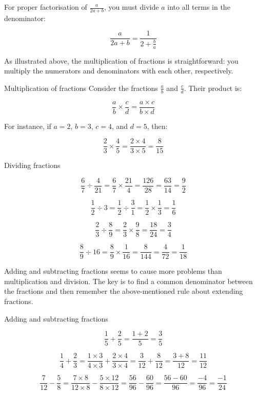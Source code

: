 For proper factorisation of \(\frac{a}{2a + b}\), you must divide \(a\) into all terms in the denominator:

\[
\frac{a}{2a + b} = \frac{1}{2 + \frac{b}{a}}
\]

As illustrated above, the multiplication of fractions is straightforward: you multiply the numerators and denominators with each other, respectively.

\begin{example} Multiplication of fractions \newline
Consider the fractions \(\frac{a}{b}\) and \(\frac{c}{d}\). Their product is:

\[
\frac{a}{b} \times \frac{c}{d} = \frac{a \times c}{b \times d}
\]

For instance, if \(a = 2\), \(b = 3\), \(c = 4\), and \(d = 5\), then:

\[
\frac{2}{3} \times \frac{4}{5} = \frac{2 \times 4}{3 \times 5} = \frac{8}{15}
\]
  
\end{example} 

\begin{example} Dividing fractions

\[
\frac{6}{7} \div \frac{4}{21} = \frac{6}{7} \times \frac{21}{4} = \frac{126}{28} = \frac{63}{14} = \frac{9}{2}
\]

\[
\frac{1}{2} \div 3 = \frac{1}{2} \div \frac{3}{1} = \frac{1}{2} \times \frac{1}{3} = \frac{1}{6}
\]

\[
\frac{2}{3} \div \frac{8}{9} = \frac{2}{3} \times \frac{9}{8} = \frac{18}{24} = \frac{3}{4}
\]

\[
\frac{8}{9} \div 16 = \frac{8}{9} \times \frac{1}{16} = \frac{8}{144} = \frac{4}{72} = \frac{1}{18}
\]
  
\end{example}

Adding and subtracting fractions seems to cause more problems than multiplication and division. The key is to find a common denominator between the fractions and then remember the above-mentioned rule about extending fractions.

\begin{example} Adding and subtracting fractions

 \[
\frac{1}{5} + \frac{2}{5} = \frac{1 + 2}{5} = \frac{3}{5}
\]

\[
\frac{1}{4} + \frac{2}{3} = \frac{1 \times 3}{4 \times 3} + \frac{2 \times 4}{3 \times 4} = \frac{3}{12} + \frac{8}{12} = \frac{3 + 8}{12} = \frac{11}{12}
\]

\[
\frac{7}{12} - \frac{5}{8} = \frac{7 \times 8}{12 \times 8} - \frac{5 \times 12}{8 \times 12} = \frac{56}{96} - \frac{60}{96} = \frac{56 - 60}{96} = \frac{-4}{96} = \frac{-1}{24}
\]

\end{example}

